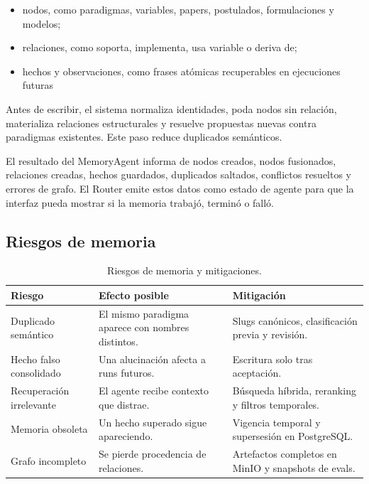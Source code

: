 \begin{itemize}
\item nodos, como paradigmas, variables, papers, postulados, formulaciones y modelos;
\item relaciones, como soporta, implementa, usa variable o deriva de;
\item hechos y observaciones, como frases atómicas recuperables en ejecuciones futuras
\end{itemize}

Antes de escribir, el sistema normaliza identidades, poda nodos sin relación,
materializa relaciones estructurales y resuelve propuestas nuevas contra
paradigmas existentes. Este paso reduce duplicados semánticos.

El resultado del MemoryAgent informa de nodos creados, nodos fusionados,
relaciones creadas, hechos guardados, duplicados saltados, conflictos resueltos
y errores de grafo. El Router emite estos datos como estado de agente para que
la interfaz pueda mostrar si la memoria trabajó, terminó o falló.

\subsection{Riesgos de memoria}

\begin{table}[H]
\begin{center}
\small
\begin{tabular}{|p{3cm}|p{4.8cm}|p{4.8cm}|} \hline
\textbf{Riesgo} & \textbf{Efecto posible} & \textbf{Mitigación} \\ \hline
Duplicado semántico & El mismo paradigma aparece con nombres distintos. & Slugs canónicos, clasificación previa y revisión. \\ \hline
Hecho falso consolidado & Una alucinación afecta a runs futuros. & Escritura solo tras aceptación. \\ \hline
Recuperación irrelevante & El agente recibe contexto que distrae. & Búsqueda híbrida, reranking y filtros temporales. \\ \hline
Memoria obsoleta & Un hecho superado sigue apareciendo. & Vigencia temporal y supersesión en PostgreSQL. \\ \hline
Grafo incompleto & Se pierde procedencia de relaciones. & Artefactos completos en MinIO y snapshots de evals. \\ \hline
\end{tabular}
\caption{Riesgos de memoria y mitigaciones.}
\end{center}
\end{table}

